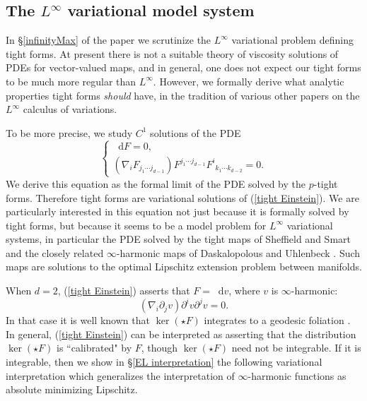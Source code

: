 \documentclass[reqno,11pt]{amsart}
\newcommand*\dif{\mathop{}\!\mathrm{d}}
\theoremstyle{definition}
\numberwithin{equation}{section}
\begin{document}
\subsection{The \texorpdfstring{$L^\infty$ variational}{L-infinity variational} model system}
In \S\ref{infinityMax} of the paper we scrutinize the $L^\infty$ variational problem defining tight forms.
At present there is not a suitable theory of viscosity solutions of PDEs for vector-valued maps, and in general, one does not expect our tight forms to be much more regular than $L^\infty$.
However, we formally derive what analytic properties tight forms \emph{should} have, in the tradition of various other papers \cite{Barron2001,Aronsson67,Sheffield12} on the $L^\infty$ calculus of variations.

To be more precise, we study $C^1$ solutions of the PDE 
\begin{equation}\label{tight Einstein}
\begin{cases}\dif F = 0, \\
	(\nabla_i F_{j_1 \cdots j_{d - 1}}) F^{j_1 \cdots j_{d - 1}} {F^i}_{k_1 \cdots k_{d - 2}} = 0.
\end{cases}
\end{equation}
We derive this equation as the formal limit of the PDE solved by the $p$-tight forms.
Therefore tight forms are variational solutions of (\ref{tight Einstein}).
We are particularly interested in this equation not just because it is formally solved by tight forms, but because it seems to be a model problem for $L^\infty$ variational systems, in particular the PDE solved by the tight maps of Sheffield and Smart \cite{Sheffield12} and the closely related $\infty$-harmonic maps of Daskalopolous and Uhlenbeck \cite{daskalopoulos2022,daskalopoulos2023}.
Such maps are solutions to the optimal Lipschitz extension problem between manifolds.

When $d = 2$, (\ref{tight Einstein}) asserts that $F = \dif v$, where $v$ is $\infty$-harmonic:
$$(\nabla_i \partial_j v) \partial^i v \partial^j v = 0.$$
In that case it is well known that $\ker(\star F)$ integrates to a geodesic foliation \cite[Proof of Theorem 1.5]{Sheffield12}.
In general, (\ref{tight Einstein}) can be interpreted as asserting that the distribution $\ker(\star F)$ is ``calibrated" by $F$, though $\ker(\star F)$ need not be integrable.
If it is integrable, then we show in \S\ref{EL interpretation} the following variational interpretation which generalizes the interpretation of $\infty$-harmonic functions as absolute minimizing Lipschitz.
\end{document}
